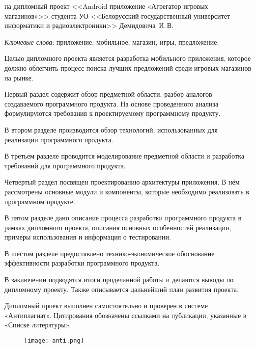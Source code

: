 \thispagestyle{empty}

\begin{center}
  \begin{minipage}{0.82\textwidth}
    на дипломный проект <<Android приложение «Агрегатор игровых магазинов»>> студента УО <<Белорусский государственный университет информатики и радиоэлектроники>>
    \linebreak Демидовича~И.\,В.
  \end{minipage}
\end{center}

\emph{Ключевые слова}: приложение, мобильное, магазин, игры, предложение.
\vspace{1\parsep}

Целью дипломного проекта является разработка мобильного приложения, которое должно облегчить процесс поиска лучших предложений среди игровых магазинов на рынке.

Первый раздел содержит обзор предметной области, разбор аналогов создаваемого программного продукта. На основе проведенного анализа формулируются требования к проектируемому программному продукту.

В втором разделе производится обзор технологий, использованных для реализации программного продукта.

В третьем разделе проводится моделирование предметной области и разработка требований для программного продукта.

Четвертый раздел посвящен проектированию архитектуры приложения. В нём рассмотрены основные модули и компоненты, которые необходимо реализовать в программном продукте.

В пятом разделе дано описание процесса разработки программного продукта в рамках дипломного проекта, описания основных особенностей реализации, примеры использования и информация о тестировании.

В шестом разделе предоставлено технико-экономическое обоснование эффективности разработки программного продукта.

В заключении подводятся итоги проделанной работы и делаются выводы по дипломному проекту. Также описывается дальнейший план развития проекта.

Дипломный проект выполнен самостоятельно и проверен в системе «Антиплагиат». Цитирования обозначены ссылками на публикации, указанные в «Списке литературы».
\begin{figure}[H]
  \centering
    \texttt{[image: anti.png]} 
    \label{fig:anti}
 \end{figure}
\clearpage